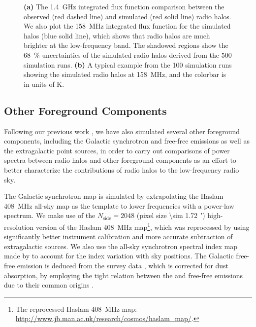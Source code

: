 \documentclass[modern]{aastex62}
\newcommand{\R}[1]{\mathrm{#1}}
\newcommand{\Halpha}{\text{H$\alpha$}}
\begin{document}
\begin{figure}
  \caption{\label{fig:halos-simucomp-example}%
    \textbf{(a)} The \SI{1.4}{\GHz} integrated flux function comparison
    between the observed (red dashed line) and simulated (red solid line)
    radio halos.  We also plot the \SI{158}{\MHz} integrated flux function
    for the simulated halos (blue solid line), which shows that radio
    halos are much brighter at the low-frequency band.  The shadowed
    regions show the \SI{68}{\percent} uncertainties of the simulated
    radio halos derived from the 500 simulation runs.
    \textbf{(b)} A typical example from the 100 simulation runs showing
    the simulated radio halos at \SI{158}{\MHz}, and the colorbar is in
    units of \si{\kelvin}.
  }
\end{figure}


\subsection{Other Foreground Components}
\label{sec:fg-other}

Following our previous work \citep{wang2010}, we have also simulated
several other foreground components, including the Galactic synchrotron
and free-free emissions as well as the extragalactic point sources,
in order to carry out comparisons of power spectra between radio halos
and other foreground components as an effort to better characterize the
contributions of radio halos to the low-frequency radio sky.

The Galactic synchrotron map is simulated by extrapolating the
Haslam \SI{408}{\MHz} all-sky map as the template to lower frequencies
with a power-law spectrum.
We make use of the $N_{\R{side}} = 2048$
(pixel size \SI{\sim 1.72}{\arcminute})
high-resolution version of the Haslam \SI{408}{\MHz} map\footnote{%
  The reprocessed Haslam \SI{408}{\MHz} map:
  \url{http://www.jb.man.ac.uk/research/cosmos/haslam_map/}.},
which was reprocessed by \citet{remazeilles2015} using significantly
better instrument calibration and more accurate subtraction of
extragalactic sources.
We also use the all-sky synchrotron spectral index map made by
\citet{giardino2002} to account for the index variation with sky positions.
The Galactic free-free emission is deduced from the \Halpha{} survey
data \citep{finkbeiner2003}, which is corrected for dust absorption,
by employing the tight relation between the \Halpha{} and free-free
emissions due to their common origins \citep{dickinson2003}.
\end{document}
